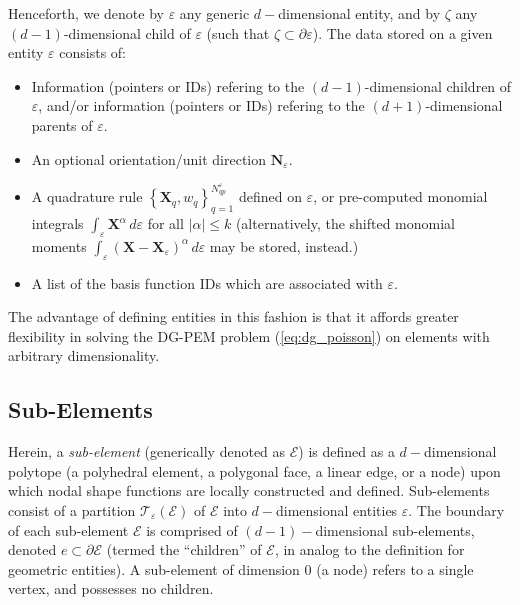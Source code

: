 	Henceforth, we denote by $\varepsilon$ any generic $d-$dimensional entity, and by $\zeta$ any $(d-1)$-dimensional child of $\varepsilon$ (such that $\zeta \subset \partial \varepsilon$). The data stored on a given entity $\varepsilon$ consists of:
	\begin{itemize}
		\item Information (pointers or IDs) refering to the $(d-1)$-dimensional children of $\varepsilon$, and/or information (pointers or IDs) refering to the $(d+1)$-dimensional parents of $\varepsilon$.
		\item An optional orientation/unit direction $\mathbf{N}_\varepsilon$.
		\item A quadrature rule $\left\{ \mathbf{X}_q, w_q \right\}_{q=1}^{N^{\varepsilon}_{qp}}$ defined on $\varepsilon$, or pre-computed monomial integrals $\int_{\varepsilon} \mathbf{X}^\alpha \, d \varepsilon$ for all $|\alpha| \leq k$ (alternatively, the shifted monomial moments $\int_{\varepsilon} (\mathbf{X}-\mathbf{X}_{\varepsilon})^\alpha \, d \varepsilon$ may be stored, instead.)
		\item A list of the basis function IDs which are associated with $\varepsilon$.
	\end{itemize}
	
	The advantage of defining entities in this fashion is that it affords greater flexibility in solving the DG-PEM problem (\ref{eq:dg_poisson}) on elements with arbitrary dimensionality.
	
\subsection*{Sub-Elements}

	Herein, a \textit{sub-element} (generically denoted as $\mathcal{E}$) is defined as a $d-$dimensional polytope (a polyhedral element, a polygonal face, a linear edge, or a node) upon which nodal shape functions are locally constructed and defined. Sub-elements consist of a partition $\mathcal{T}_{\varepsilon} (\mathcal{E})$ of $\mathcal{E}$ into $d-$dimensional entities $\varepsilon$. The boundary of each sub-element $\mathcal{E}$ is comprised of $(d-1)-$dimensional sub-elements, denoted $e \subset \partial \mathcal{E}$ (termed the ``children'' of $\mathcal{E}$, in analog to the definition for geometric entities). A sub-element of dimension $0$ (a node) refers to a single vertex, and possesses no children.
	
